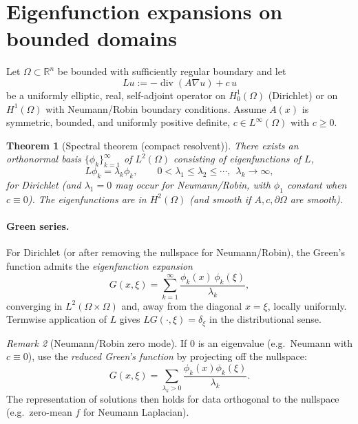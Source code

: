 \documentclass[11pt]{article}
\newtheorem{theorem}{Theorem}[section]
\theoremstyle{definition}
\theoremstyle{remark}
\newtheorem{remark}[theorem]{Remark}
\DeclareMathOperator{\divg}{div}
\begin{document}
	
	
	\section{Eigenfunction expansions on bounded domains}
	\label{sec:eigexp}
	
	Let $\Omega\subset\mathbb{R}^n$ be bounded with sufficiently regular boundary and let
	\[
	L u := -\divg(A\nabla u)+c\,u
	\]
	be a uniformly elliptic, real, self-adjoint operator on $H_0^1(\Omega)$ (Dirichlet) or on
	$H^1(\Omega)$ with Neumann/Robin boundary conditions. Assume $A(x)$ is symmetric, bounded,
	and uniformly positive definite, $c\in L^\infty(\Omega)$ with $c\ge 0$.
	
	\begin{theorem}[Spectral theorem (compact resolvent)]
		There exists an orthonormal basis $\{\phi_k\}_{k=1}^\infty$ of $L^2(\Omega)$ consisting of
		eigenfunctions of $L$,
		\[
		L\phi_k=\lambda_k \phi_k,\qquad 0<\lambda_1\le \lambda_2\le \cdots,\ \ \lambda_k\to\infty,
		\]
		for Dirichlet (and $\lambda_1=0$ may occur for Neumann/Robin, with $\phi_1$ constant when $c\equiv0$).
		The eigenfunctions are in $H^2(\Omega)$ (and smooth if $A,c,\partial\Omega$ are smooth).
	\end{theorem}
	
	\paragraph{Green series.}
	For Dirichlet (or after removing the nullspace for Neumann/Robin), the Green's function admits
	the \emph{eigenfunction expansion}
	\begin{equation}
		\label{eq:Gseries}
		G(x,\xi)=\sum_{k=1}^\infty \frac{\phi_k(x)\,\phi_k(\xi)}{\lambda_k},
	\end{equation}
	converging in $L^2(\Omega\times\Omega)$ and, away from the diagonal $x=\xi$, locally uniformly.
	Termwise application of $L$ gives $LG(\cdot,\xi)=\delta_\xi$ in the distributional sense.
	
	\begin{remark}[Neumann/Robin zero mode]
		If $0$ is an eigenvalue (e.g.\ Neumann with $c\equiv0$), use the \emph{reduced Green's function}
		by projecting off the nullspace:
		\[
		G(x,\xi)=\sum_{\lambda_k>0}\frac{\phi_k(x)\phi_k(\xi)}{\lambda_k}.
		\]
		The representation of solutions then holds for data orthogonal to the nullspace (e.g.\ zero-mean $f$ for Neumann Laplacian).
	\end{remark}
	
\end{document}
